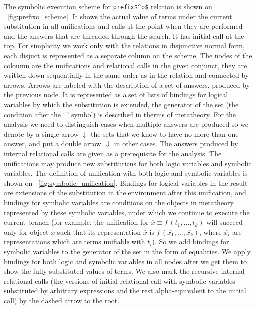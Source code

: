 The symbolic execution scheme for \lstinline|prefix$^o$| relation is shown on \figureword~\ref{fig:prefixo_scheme}. It shows the actual value of terms under the current
substitution in all unifications and calls at the point when they are performed and the answers that are threaded through the search. It has initial call at the top.
For simplicity we work only with the relations in disjunctive normal form, each disjuct is represented as a separate column on the scheme. The nodes of the coloumn are
the unifications and relational calls in the given conjunct, they are written down sequentially in the same order as in the relation and connected by arrows. Arrows are
labeled with the description of a set of answers, produced by the previous node. It is represented as a set of lists of bindings for logical variables by which the
substitution is extended, the generator of the set (the condition after the `$\mid$' symbol) is described in therms of metatheory. For the analysis we need to distinguish
cases when multiple answers are produced so we denote by a single arrow $\downarrow$ the sets that we know to have no more than one answer, and put a double arrow $\Downarrow$
in other cases. The answers produced by internal relational calls are given as a prerequisite for the analysis. The unifications may produce new substitutions for
both logic variables and symbolic variables. The definition of unification with both logic and symbolic variables is shown on \figureword~\ref{fig:symbolic_unification}.
Bindings for logical variables in the result are extensions of the substitution in the environment after this unification, and bindings for symbolic variables are conditions
on the objects in metatheory represented by these symbolic variables, under which we continue to execute the current branch (for example, the unification for $\overline{x} \equiv f\,(t_1, \dots, t_k)$ will succeed only for object $x$ such that its representation $\overline{x}$ is $f\,(\overline{x_1}, \dots, \overline{x_k})$, where $\overline{x_i}$ are representations which are terms
unifiable with $t_i$). So we add bindings for symbolic variables to the generator of the set in the form of equalities. We apply bindings for both logic and symbolic variables in
all nodes after we get them to show the fully substituted values of terms. We also mark the recursive internal relational calls (the versions of initial relational call with
symbolic variables substituted by arbitrary expressions and the rest alpha-equivalent to the initial call) by the dashed arrow to the root.

